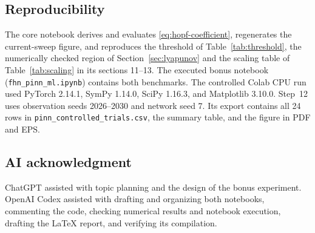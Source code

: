 \documentclass[11pt,a4paper]{article}
\begin{document}
\subsection*{Reproducibility}

The core notebook derives and evaluates \eqref{eq:hopf-coefficient}, regenerates the current-sweep figure, and reproduces the threshold of Table~\ref{tab:threshold}, the numerically checked region of Section~\ref{sec:lyapunov} and the scaling table of Table~\ref{tab:scaling} in its sections 11--13. The executed bonus notebook (\texttt{fhn\_pinn\_ml.ipynb}) contains both benchmarks. The controlled Colab CPU run used PyTorch 2.14.1, SymPy 1.14.0, SciPy 1.16.3, and Matplotlib 3.10.0. Step~12 uses observation seeds 2026--2030 and network seed 7. Its export contains all 24 rows in \texttt{pinn\_controlled\_trials.csv}, the summary table, and the figure in PDF and EPS.

\clearpage

\subsection*{AI acknowledgment}

ChatGPT assisted with topic planning and the design of the bonus experiment. OpenAI Codex assisted with drafting and organizing both notebooks, commenting the code, checking numerical results and notebook execution, drafting the LaTeX report, and verifying its compilation.

\begingroup
\footnotesize
\setlength{\parskip}{0pt}
\setlength{\bibsep}{0.1em}


\endgroup
\end{document}
